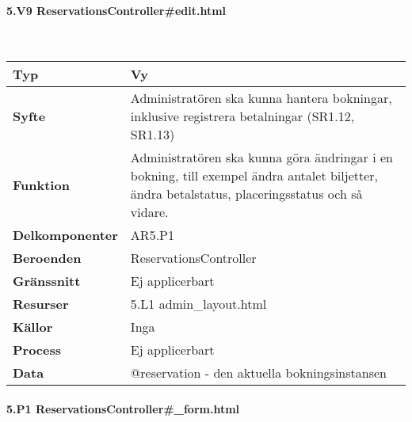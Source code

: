 \documentclass[a4paper, twoside, 11pt, titlepage]{article}
\begin{document}
			\paragraph{5.V9 ReservationsController\#edit.html}\

			\begin {table} [ht] \begin{tabular} {  p{3.5cm} p{11.6cm} }
				\hline
				{\sffamily\textbf{Typ}} & {Vy} \\
				\hline
				{\sffamily\textbf{Syfte}} & {Administratören ska kunna hantera bokningar, inklusive registrera betalningar (SR1.12, SR1.13)} \\
				\hline
				{\sffamily\textbf{Funktion}} & {Administratören ska kunna göra ändringar i en bokning, till exempel ändra antalet biljetter, ändra betalstatus, placeringsstatus och så vidare.} \\
				\hline
				{\sffamily\textbf{Delkomponenter}} & {AR5.P1} \\
				\hline
				{\sffamily\textbf{Beroenden}} & {ReservationsController} \\
				\hline
				{\sffamily\textbf{Gränssnitt}} & {Ej applicerbart} \\
				\hline
				{\sffamily\textbf{Resurser}} & {5.L1 admin\_layout.html} \\
				\hline
				{\sffamily\textbf{Källor}} & {Inga} \\
				\hline
				{\sffamily\textbf{Process}} & {Ej applicerbart} \\
				\hline
				{\sffamily\textbf{Data}} & {@reservation - den aktuella bokningsinstansen} \\
				\hline
			\end{tabular} \end{table} \FloatBarrier


			\paragraph{5.P1 ReservationsController\#\_form.html}\
\end{document}
